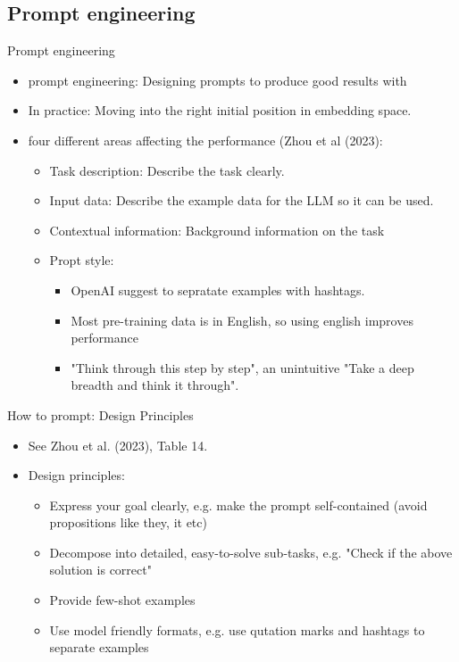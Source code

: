 \documentclass[10pt]{beamer}
\begin{document}
\subsection{Prompt engineering}

\begin{frame}{Prompt engineering}

\begin{itemize}
\item prompt engineering: Designing prompts to produce good results with 
\item In practice: Moving into the right initial position in embedding space.
\item four different areas affecting the performance (Zhou et al (2023):
\begin{itemize}
\item Task description: Describe the task clearly.
\item Input data: Describe the example data for the LLM so it can be used.
\item Contextual information: Background information on the task
\item Propt style:
\begin{itemize}
\item OpenAI suggest to sepratate examples with hashtags.
\item Most pre-training data is in English, so using english improves performance
\item "Think through this step by step", an unintuitive "Take a deep breadth and think it through".
\end{itemize}
\end{itemize}
\end{itemize}

\end{frame}


\begin{frame}{How to prompt: Design Principles}

\begin{itemize}
\item See Zhou et al. (2023), Table 14.
\item Design principles:
\begin{itemize}
\item Express your goal clearly, e.g. make the prompt self-contained (avoid propositions like they, it etc)
\item Decompose into detailed, easy-to-solve sub-tasks, e.g. "Check if the above solution is correct"
\item Provide few-shot examples
\item Use model friendly formats, e.g. use qutation marks and hashtags to separate examples
\end{itemize}
\end{itemize}

\end{frame}
\end{document}
